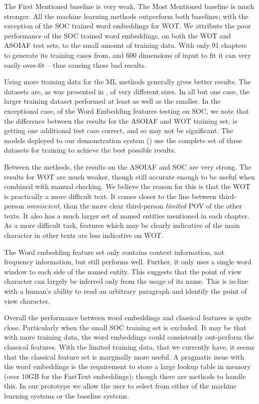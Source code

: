\documentclass[11pt,a4paper]{article}
\begin{document}
The First Mentioned baseline is very weak.
The Most Mentioned baseline is much stronger.
All the machine learning methods outperform both baselines;
with the exception of the SOC trained word embeddings for WOT.
We attribute the poor performance of the SOC trained word embeddings, on both the  WOT and ASOIAF test sets, to the small amount of training data.
With only 91 chapters to generate its training cases from, and 600 dimensions of input to fit it can very easily over-fit -- thus causing these bad results.


Using more training data for the ML methods generally gives better results.
The datasets are, as was presented in , of very different sizes.
In all but one case, the larger training dataset performed at least as well as the smaller.
In the exceptional case, of the Word Embedding features testing on SOC,
we  note that the difference between the results for the ASOIAF and WOT training set,
is getting one additional test case correct, and so may not be significant.
The models deployed to our demonstration system () use the complete set of three datasets for training to achieve the best possible results.


Between the methods, the results on the ASOIAF and SOC are very strong.
The results for WOT are much weaker, though still accurate enough to be useful
when combined with manual checking.
We believe the reason for this is that the WOT is practically a more difficult text.
It comes closer to the line between third-person \emph{omniscient}, than the more clear third-person \emph{limited} POV of the other texts.
It also has a much larger set of named entities mentioned in each chapter.
As a more difficult task, features which may be clearly indicative of the main character in other texts are less indicative on WOT.


The Word embedding feature set only contains context information, not frequency information, but still performs well.
Further, it only uses a single word window to each side of the named entity.
This suggests that the point of view character can largely be inferred only from the usage of its name. 
This is in-line with a human's ability to read an arbitrary paragraph and identify the point of view character.


Overall the performance between word embeddings and classical features is quite  close.
Particularly when the small SOC training set is excluded.
It may be that with more training data, the word embeddings could consistently out-perform the classical features.
With the limited training data, that we currently have, it seems that the classical feature set is marginally more useful.
A pragmatic issue with the word embeddings is the requirement to store a large lookup table in memory (over 10GB for the FastText embeddings); though there are methods to handle this.
In our prototype we allow the user to select from either of the machine learning systems or the baseline systems.
\end{document}
